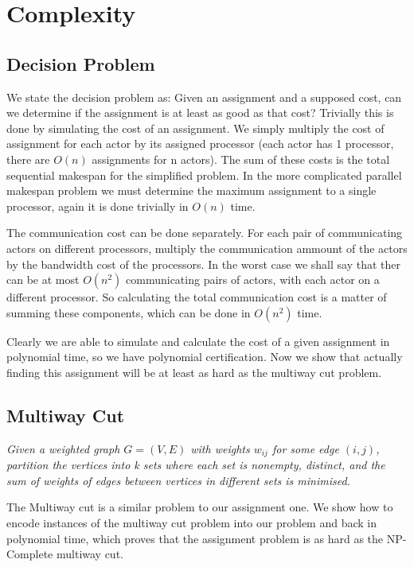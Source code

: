 \section*{Complexity}

\subsection*{Decision Problem}
We state the decision problem as: Given an assignment and a supposed cost, can we determine if the assignment is at least as good as that cost?
Trivially this is done by simulating the cost of an assignment.
We simply multiply the cost of assignment for each actor by its assigned processor (each actor has 1 processor, there are $O(n)$ assignments for n actors).
The sum of these costs is the total sequential makespan for the simplified problem.
In the more complicated parallel makespan problem we must determine the maximum assignment to a single processor, again it is done trivially in $O(n)$ time.

The communication cost can be done separately.
For each pair of communicating actors on different processors, multiply the communication ammount of the actors by the bandwidth cost of the processors.
In the worst case we shall say that ther can be at most $O(n^2)$ communicating pairs of actors, with each actor on a different processor.
So calculating the total communication cost is a matter of summing these components, which can be done in $O(n^2)$ time.

Clearly we are able to simulate and calculate the cost of a given assignment in polynomial time, so we have polynomial certification.
Now we show that actually finding this assignment will be at least as hard as the multiway cut problem.

\subsection*{Multiway Cut}

{\em Given a weighted graph $G = (V,E)$ with weights $w_{ij}$ for some edge $(i,j)$, partition the vertices into k sets where each set is nonempty, distinct, and the sum of weights of edges between vertices in different sets is minimised.}

The Multiway cut is a similar problem to our assignment one.
We show how to encode instances of the multiway cut problem into our problem and back in polynomial time, which proves that the assignment problem is as hard as the NP-Complete multiway cut.

